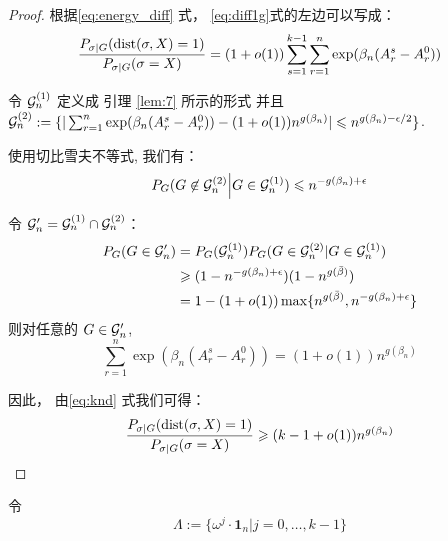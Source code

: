 \begin{proof}
根据\eqref{eq:energy_diff} 式，
\eqref{eq:diff1g}式的左边可以写成：
\begin{equation}\label{eq:knd}
	\frac{P_{\sigma|G}(\operatorname{dist}(\sigma, X)=1)}
{P_{\sigma|G}(\sigma=X)}= (1+o(1))\sum_{s=1}^{k-1}\sum_{r=1}^n \exp(\beta_n (A_r^s - A_r^0))
\end{equation}

令 $\mathcal{G}^{(1)}_n$ 定义成 引理 \ref{lem:7} 所示的形式
并且 $\cG^{(2)}_n: = \{|\sum_{r=1}^n \exp(\beta_n (A_r^s - A_r^0)) -\linebreak (1+o(1))n^{g(\beta_n)}  | \leq n^{g(\beta_n) - \epsilon / 2} \}$.

使用切比雪夫不等式, 我们有：
\begin{equation*}
  P_G(G \not\in \mathcal{G}^{(2)}_n \Big\vert  G \in \mathcal{G}^{(1)}_n) \leqslant n^{- g(\beta_n) + \epsilon}
  \end{equation*}
  
  令 $\mathcal{G}'_n = \mathcal{G}^{(1)}_n \cap \mathcal{G}^{(2)}_n$：
  \begin{align*}
  P_G(G \in \mathcal{G}'_n) &= P_G(\mathcal{G}^{(1)}_n) P_G(G \in \mathcal{G}_n^{(2)} | G \in \mathcal{G}_n^{(1)}) \\
  & \geqslant (1-n^{ - g(\beta_n) + \epsilon})(1-n^{g(\bar{\beta})}) \\
  &= 1-(1+o(1))\max\{n^{g(\bar{\beta})}, n^{- g(\beta_n) + \epsilon} \}
  \end{align*}
  则对任意的 $G\in\mathcal{G}'_n$,
  \begin{equation*}
  \sum_{r=1}^n \exp(\beta_n (A_r^s - A_r^0)) = (1+o(1)) n^{g(\beta_n)}
  \end{equation*}
  
  因此，
  由\eqref{eq:knd} 式我们可得：
  \begin{equation*}
    \frac{P_{\sigma|G}(\operatorname{dist}(\sigma, X)=1)}
  {P_{\sigma|G}(\sigma=X)} \geqslant (k-1+o(1)) n^{g(\beta_n)}
  \end{equation*}
\end{proof}


令
\begin{equation}\label{eq:Big_Lambda}
  \Lambda := \{ \omega^j  \cdot \mathbf{1}_n | j=0, \dots,k-1\}   
\end{equation}

